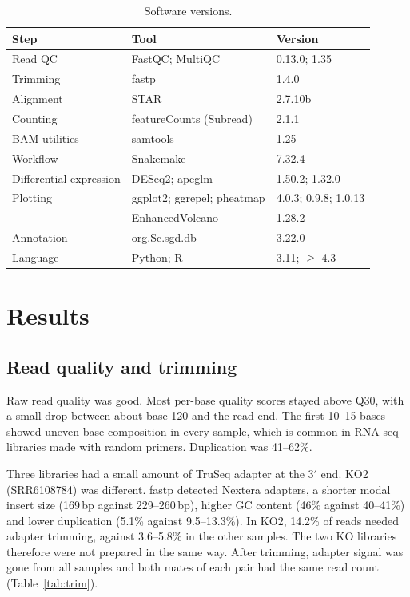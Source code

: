 \documentclass[11pt, a4paper]{article}
\begin{document}
\begin{table}[tbp]
\centering
\caption{Software versions.}
\label{tab:software}
\begin{tabular}{lll}
\toprule
Step & Tool & Version \\
\midrule
Read QC & FastQC; MultiQC & 0.13.0; 1.35 \\
Trimming & fastp & 1.4.0 \\
Alignment & STAR & 2.7.10b \\
Counting & featureCounts (Subread) & 2.1.1 \\
BAM utilities & samtools & 1.25 \\
Workflow & Snakemake & 7.32.4 \\
Differential expression & DESeq2; apeglm & 1.50.2; 1.32.0 \\
Plotting & ggplot2; ggrepel; pheatmap & 4.0.3; 0.9.8; 1.0.13 \\
 & EnhancedVolcano \cite{blighe2025} & 1.28.2 \\
Annotation & org.Sc.sgd.db \cite{carlson2025} & 3.22.0 \\
Language & Python; R & 3.11; $\geq$ 4.3 \\
\bottomrule
\end{tabular}
\end{table}

\FloatBarrier
\section{Results}

\subsection{Read quality and trimming}\label{sec:qc}
Raw read quality was good. Most per-base quality scores stayed above Q30, with a small drop between about base 120 and the read end. The first 10--15 bases showed uneven base composition in every sample, which is common in RNA-seq libraries made with random primers. Duplication was 41--62\%.

Three libraries had a small amount of TruSeq adapter at the 3$'$ end. KO2 (SRR6108784) was different. fastp detected Nextera adapters, a shorter modal insert size (169\,bp against 229--260\,bp), higher GC content (46\% against 40--41\%) and lower duplication (5.1\% against 9.5--13.3\%). In KO2, 14.2\% of reads needed adapter trimming, against 3.6--5.8\% in the other samples. The two KO libraries therefore were not prepared in the same way. After trimming, adapter signal was gone from all samples and both mates of each pair had the same read count (Table~\ref{tab:trim}).
\end{document}
